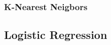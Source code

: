 \documentclass[10pt]{beamer}
\begin{document}
\begin{frame}
	\frametitle{K-Nearest Neigbors}
	\begin{figure}[htbp]
		\centering
		\qquad\quad
		\qquad\quad
	\end{figure}
\end{frame}

\subsection{Logistic Regression}
\end{document}
